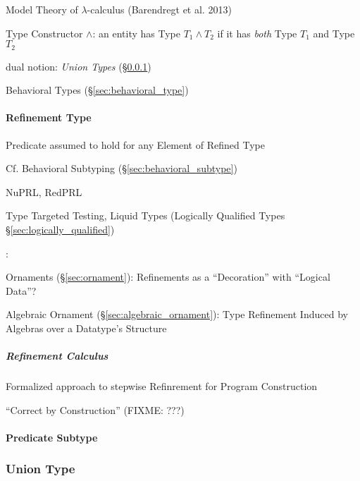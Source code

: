 Model Theory of $\lambda$-calculus (Barendregt et al. 2013)

Type Constructor $\wedge$: an entity has Type $T_1 \wedge T_2$ if it
has \emph{both} Type $T_1$ and Type $T_2$


dual notion: \emph{Union Types} (\S\ref{sec:union_type})

\fist Behavioral Types (\S\ref{sec:behavioral_type})



\paragraph{Refinement Type}\label{sec:refinement_type}\hfill


Predicate assumed to hold for any Element of Refined Type

\fist Cf. Behavioral Subtyping (\S\ref{sec:behavioral_subtype})

NuPRL, RedPRL

Type Targeted Testing, Liquid Types (Logically Qualified Types
\S\ref{sec:logically_qualified})


\asterism


\cite{mcbride13}:

Ornaments (\S\ref{sec:ornament}): Refinements as a ``Decoration'' with
``Logical Data''? %

Algebraic Ornament (\S\ref{sec:algebraic_ornament}): Type Refinement
Induced by Algebras over a Datatype's Structure



\subparagraph{Refinement Calculus}\label{sec:refinement_calculus}\hfill

Formalized approach to stepwise Refinrement for Program Construction

``Correct by Construction'' (FIXME: ???)



\paragraph{Predicate Subtype}\label{sec:predicate_subtype}\hfill



\subsubsection{Union Type}\label{sec:union_type}

